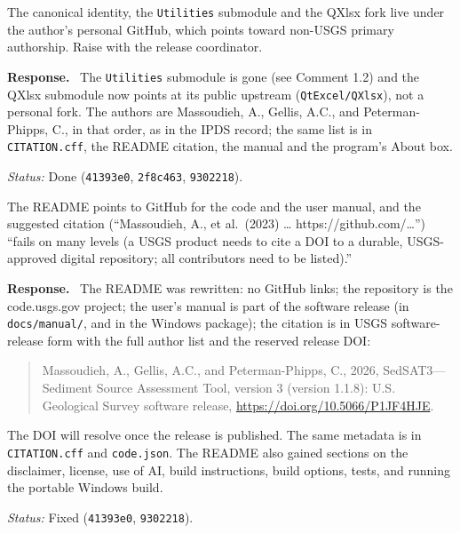 \documentclass[11pt]{article}
\newcommand{\code}[1]{\texttt{#1}}
\newcommand{\commit}[1]{\texttt{#1}}
\newcounter{cmt}
\newcounter{grp}
\renewcommand{\thecmt}{\thegrp.\arabic{cmt}}
\newenvironment{reviewer}[1]{%
  \refstepcounter{cmt}%
  \begin{tcolorbox}[enhanced,breakable,colback=commentbg,colframe=usgsgreen!60,
    boxrule=0.4pt,left=6pt,right=6pt,top=4pt,bottom=4pt,
    title={\small\textbf{Comment \thecmt}\hfill\textit{#1}},
    coltitle=black,colbacktitle=usgsgreen!15,fonttitle=\small]}%
  {\end{tcolorbox}}
\newenvironment{response}{\par\noindent\textbf{Response.}\ }{\par\medskip}
\newcommand{\status}[1]{\par\noindent\textit{Status:} #1\par}
\begin{document}
\begin{reviewer}{Summary, blocker 3}
The canonical identity, the \code{Utilities} submodule and the QXlsx fork
live under the author's personal GitHub, which points toward non-USGS
primary authorship. Raise with the release coordinator.
\end{reviewer}
\begin{response}
The \code{Utilities} submodule is gone (see Comment 1.2) and the QXlsx
submodule now points at its public upstream (\code{QtExcel/\allowbreak{}QXlsx}), not a
personal fork. The authors are Massoudieh, A., Gellis, A.C., and
Peterman-Phipps, C., in that order, as in the IPDS record; the same list is
in \code{CITATION.\allowbreak{}cff}, the README citation, the manual and the
program's About box.
\end{response}
\status{Done (\commit{41393e0}, \commit{2f8c463}, \commit{9302218}).}

\begin{reviewer}{Email 10/15}
The README points to GitHub for the code and the user manual, and the
suggested citation (``Massoudieh, A., et al.\ (2023) \ldots
https://github.com/\ldots'') ``fails on many levels (a USGS product needs to
cite a DOI to a durable, USGS-approved digital repository; all contributors
need to be listed).''
\end{reviewer}
\begin{response}
The README was rewritten: no GitHub links; the repository is the
code.usgs.gov project; the user's manual is part of the software release (in
\code{docs/\allowbreak{}manual/}, and in the Windows package); the citation is in
USGS software-release form with the full author list and the reserved release
DOI:
\begin{quote}\small
Massoudieh, A., Gellis, A.C., and Peterman-Phipps, C., 2026,
SedSAT3---Sediment Source Assessment Tool, version 3 (version 1.1.8): U.S.
Geological Survey software release, \url{https://doi.org/10.5066/P1JF4HJE}.
\end{quote}
The DOI will resolve once the release is published. The same metadata is in
\code{CITATION.\allowbreak{}cff} and \code{code.\allowbreak{}json}. The README also gained
sections on the disclaimer, license, use of AI, build instructions, build
options, tests, and running the portable Windows build.
\end{response}
\status{Fixed (\commit{41393e0}, \commit{9302218}).}
\end{document}
